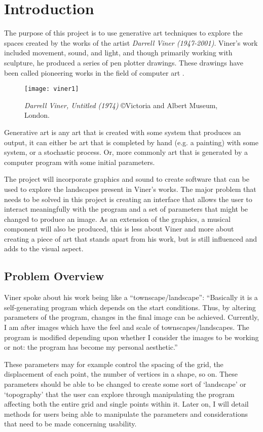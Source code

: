 \chapter{Introduction}
The purpose of this project is to use generative art techniques to explore the
spaces created by the works of the artist \emph{Darrell Viner (1947-2001)}. Viner's work
included movement, sound, and light, and though primarily working with
sculpture, he produced a series of pen plotter drawings. These drawings have
been called pioneering works in the field of computer art \citep{viner_bio}.

\begin{figure}[H]
    \texttt{[image: viner1]}
    \centering
    \caption{\emph{Darrell Viner, Untitled (1974)} \copyright Victoria and Albert Museum, London.}
\end{figure}

Generative art is any art that is created with some system that produces
an output, it can either be art that is completed by hand (e.g. a painting)
with some system, or a stochastic process. Or, more commonly art that is
generated by a computer program with some initial parameters.

The project will incorporate graphics and sound to create software that can be
used to explore the landscapes present in Viner's works. The major problem that
needs to be solved in this project is creating an interface that allows the user
to interact meaningfully with the program and a set of parameters that might be
changed to produce an image. As an extension of the graphics, a musical
component will also be produced, this is less about Viner and more about
creating a piece of art that stands apart from his work, but is still influenced
and adds to the visual aspect.

\section{Problem Overview}
Viner spoke about his work being like a ``townscape/landscape'': 
``Basically it is a self-generating program which depends on the start
conditions. Thus, by altering parameters of the program, changes in the
final image can be achieved. Currently, I am after images which have the feel and
scale of townscapes/landscapes. The program is modified depending upon whether I
consider the images to be working or not: the program has become my personal
aesthetic.'' \cite{viner_artiststatement}

These parameters may for example control the spacing of the grid, the
displacement of each point, the number of vertices in a shape, so on. These
parameters should be able to be changed to create some sort of `landscape' or
`topography' that the user can explore through manipulating the program
affecting both the entire grid and single points within it. Later on, I will
detail methods for users being able to manipulate the parameters and
considerations that need to be made concerning usability.

